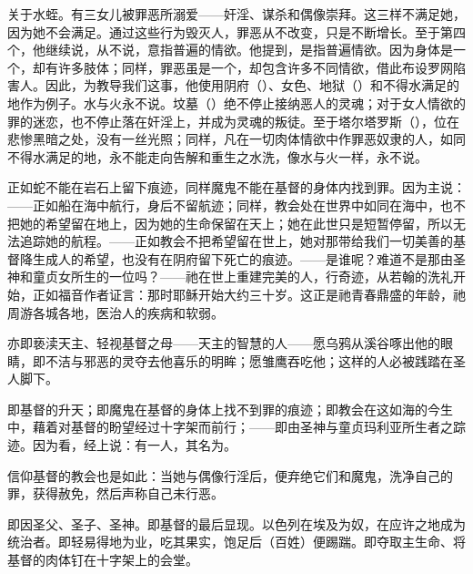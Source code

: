 关于水蛭。有三女儿被罪恶所溺爱——奸淫、谋杀和偶像崇拜。这三样不满足她，因为她不会满足。通过这些行为毁灭人，罪恶从不改变，只是不断增长。至于第四个，他继续说，从不说，意指普遍的情欲。他提到，是指普遍情欲。因为身体是一个，却有许多肢体；同样，罪恶虽是一个，却包含许多不同情欲，借此布设罗网陷害人。因此，为教导我们这事，他使用阴府（）、女色、地狱（）和不得水满足的地作为例子。水与火永不说。坟墓（）绝不停止接纳恶人的灵魂；对于女人情欲的罪的迷恋，也不停止落在奸淫上，并成为灵魂的叛徒。至于塔尔塔罗斯（），位在悲惨黑暗之处，没有一丝光照；同样，凡在一切肉体情欲中作罪恶奴隶的人，如同不得水满足的地，永不能走向告解和重生之水洗，像水与火一样，永不说。\par

正如蛇不能在岩石上留下痕迹，同样魔鬼不能在基督的身体内找到罪。因为主说：——正如船在海中航行，身后不留航迹；同样，教会处在世界中如同在海中，也不把她的希望留在地上，因为她的生命保留在天上；她在此世只是短暂停留，所以无法追踪她的航程。——正如教会不把希望留在世上，她对那带给我们一切美善的基督降生成人的希望，也没有在阴府留下死亡的痕迹。——是谁呢？难道不是那由圣神和童贞女所生的一位吗？——祂在世上重建完美的人，行奇迹，从若翰的洗礼开始，正如福音作者证言：那时耶稣开始大约三十岁。这正是祂青春鼎盛的年龄，祂周游各城各地，医治人的疾病和软弱。\par

亦即亵渎天主、轻视基督之母——天主的智慧的人——愿乌鸦从溪谷啄出他的眼睛，即不洁与邪恶的灵夺去他喜乐的明眸；愿雏鹰吞吃他；这样的人必被践踏在圣人脚下。\par

即基督的升天；即魔鬼在基督的身体上找不到罪的痕迹；即教会在这如海的今生中，藉着对基督的盼望经过十字架而前行；——即由圣神与童贞玛利亚所生者之踪迹。因为看，经上说：有一人，其名为。\par

信仰基督的教会也是如此：当她与偶像行淫后，便弃绝它们和魔鬼，洗净自己的罪，获得赦免，然后声称自己未行恶。\par

即因圣父、圣子、圣神。即基督的最后显现。以色列在埃及为奴，在应许之地成为统治者。即轻易得地为业，吃其果实，饱足后（百姓）便踢踹。即夺取主生命、将基督的肉体钉在十字架上的会堂。\par


